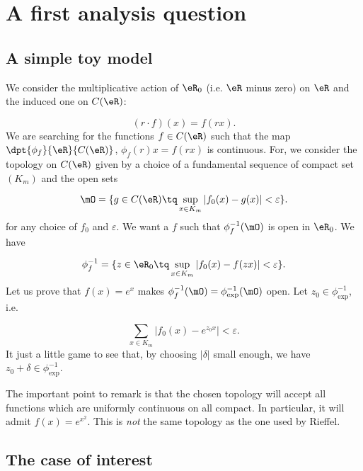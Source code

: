 
\section{A first analysis question}

\subsection{A simple toy model}

We consider the multiplicative action of $\eR_0$ (i.e. $\eR$ minus zero) on $\eR$ and the induced one on $C(\eR)$:

\begin{equation}
(r\cdot f)(x)=f(rx).
\end{equation}
We are searching for the functions $f\in C(\eR)$ such that the map $\dpt{\phi_f}{\eR}{C(\eR)}$, $\phi_f(r)x=f(rx)$ is continuous. For, we consider the topology on $C(\eR)$ given by a choice of a fundamental sequence of compact set $(K_m)$ and the open sets 

\[ 
  \mO=\{ g\in C(\eR)\tq \sup_{x\in K_m}| f_0(x)-g(x) |<\varepsilon \}.
\]
for any choice of $f_0$ and $\varepsilon$. We want a $f$ such that $\phi_f^{-1}(\mO)$ is open in $\eR_0$. We have

\begin{equation}
\phi^{-1}_f=\{ z\in\eR_0\tq \sup_{x\in K_m}| f_0(x)-f(zx) |<\varepsilon \}.
\end{equation}
Let us prove that $f(x)=e^x$ makes $\phi_f^{-1}(\mO)=\phi_{\exp}^{-1}(\mO)$ open. Let $z_0\in \phi^{-1}_{\exp}$, i.e.

\[ 
  \sum_{x\in K_m}| f_0(x)-e^{z_0x} |<\varepsilon.
\]
It just a little game to see that, by choosing $| \delta |$ small enough, we have $z_0+\delta\in\phi_{\exp}^{-1}$.
 
The important point to remark is that the chosen topology will accept all functions which are uniformly continuous on all compact. In particular, it will admit $f(x)=e^{x^2}$. This is \emph{not} the same topology as the one used by Rieffel.

\subsection{The case of interest}

